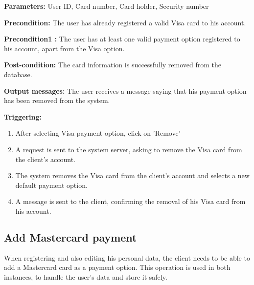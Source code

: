 \begin{description}

\item \textbf{Parameters:} User ID, Card number, Card holder, Security number

\item \textbf{Precondition:} The user has already registered a valid
Visa card to his account.
\item \textbf{Precondition1 :} The user has at least one valid payment option
registered to his account, apart from the Visa option.

\item \textbf{Post-condition:} The card information is successfully removed from
the database.

\item \textbf{Output messages:} The user receives a message saying that his
payment option has been removed from the system.

\item \textbf{Triggering:}
\begin{enumerate}
\item After selecting Visa payment option, click on 'Remove'

\item A request is sent to the system server, asking to remove the Visa card
from the client's account.

\item The system removes the Visa card from the client's account and selects a
new default payment option.

\item A message is sent to the client, confirming the removal of his Visa
card from his account.

\end{enumerate}

\end{description}

\subsection{Add Mastercard payment}

 When registering and also editing his personal data, the client needs to be
 able to add a Mastercard card as a payment option. This operation is used in
 both instances, to handle the user's data and store it safely.

